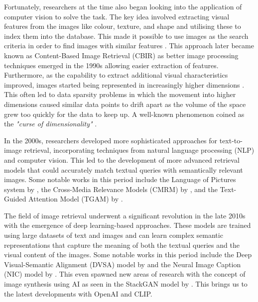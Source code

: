 \documentclass{l4proj}
\begin{document}
Fortunately, researchers at the time also began looking into the application of computer vision to solve the task. The key idea involved extracting visual features from the images like colour, texture, and shape and utilising these to index them into the database. This made it possible to use images as the search criteria in order to find images with similar features \citep{chang1981pictorial}. This approach later became known as Content-Based Image Retrieval (CBIR) as better image processing techniques emerged in the 1990s allowing easier extraction of features. Furthermore, as the capability to extract additional visual characteristics improved, images started being represented in increasingly higher dimensions \citep{zheng2017sift}. This often led to data sparsity problems in which the movement into higher dimensions caused similar data points to drift apart as the volume of the space grew too quickly for the data to keep up. A well-known phenomenon coined as the \emph{"curse of dimensionality"} \citep{bellman1957dp}.

In the 2000s, researchers developed more sophisticated approaches for text-to-image retrieval, incorporating techniques from natural language processing (NLP) and computer vision. This led to the development of more advanced retrieval models that could accurately match textual queries with semantically relevant images. Some notable works in this period include the Language of Pictures system by \cite{lavrenko2003lop}, the Cross-Media Relevance Models (CMRM) by \cite{rasiwasia2010cmmr}, and the Text-Guided Attention Model (TGAM) by \cite{gao2018tgam}.

The field of image retrieval underwent a significant revolution in the late 2010s with the emergence of deep learning-based approaches. These models are trained using large datasets of text and images and can learn complex semantic representations that capture the meaning of both the textual queries and the visual content of the images. Some notable works in this period include the Deep Visual-Semantic Alignment (DVSA) model by \cite{karpathy2015dvsa} and the Neural Image Caption (NIC) model by \cite{vinyals2015nic}. This even spawned new areas of research with the concept of image synthesis using AI as seen in the StackGAN model by \cite{zhang2017stackgan}. This brings us to the latest developments with OpenAI and CLIP.
\end{document}
